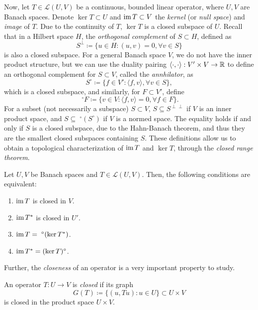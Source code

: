 Now, let $T\in \mathcal{L}(U,V)$ be a continuous, bounded linear operator, where $U,V$ are Banach spaces. Denote $\ker T\subset U$ and $\operatorname{\text{im}} T\subset V$ the \emph{kernel} (or \emph{null space}) and \emph{image} of $T$. Due to the continuity of $T$, $\ker T$ is a closed subspace of $U$. Recall that in a Hilbert space $H$, the \emph{orthogonal complement} of $S\subset H$, defined as
\begin{equation*}
    S^\perp \coloneqq \{u\in H: (u,v)=0,\forall v\in S\}
\end{equation*}
is also a closed subspace. For a general Banach space $V$, we do not have the inner product structure, but we can use the duality pairing $\langle\cdot,\cdot\rangle:V'\times V\to \mathbb{R}$ to define an orthogonal complement for $S\subset V$, called the \emph{annhilator}, as 
\begin{equation*}
    S^\circ \coloneqq \{f\in V': \langle f, v\rangle,\forall v\in S\},
\end{equation*}
which is a closed subspace, and similarly, for $F\subset V'$, define
\begin{equation*}
    \phantom{.}^\circ F \coloneqq \{v\in V:\langle f,v\rangle = 0,\forall f\in F\}.
\end{equation*}
For a subset (not necessarily a subspace) $S\subset V$, $S\subseteq S^{\perp\perp}$ if $V$ is an inner product space, and $S\subseteq\phantom{.}^\circ(S^\circ)$ if $V$ is a normed space. The equality holds if and only if $S$ is a closed subspace, due to the Hahn-Banach theorem, and thus they are the smallest closed subspaces containing $S$. These definitions allow us to obtain a topological characterization of $\operatorname{\text{im}} T$ and $\ker T$, through the \emph{closed range theorem}. 
\begin{theorem}\label{thm:closed-range-theorem}
    Let $U,V$ be Banach spaces and $T\in\mathcal{L}(U,V)$. Then, the following conditions are equivalent: 
    \begin{enumerate}
        \item $\operatorname{\text{im}} T$ is closed in $V$. 
        \item $\operatorname{\text{im}} T^*$ is closed in $U'$.
        \item $\operatorname{\text{im}} T = \phantom{.}^\circ (\ker T^*)$.
        \item $\operatorname{\text{im}} T^* = (\ker T)^\circ$.
    \end{enumerate}
\end{theorem}

Further, the \emph{closeness} of an operator is a very important property to study.
\begin{definition}
    An operator $T:U\to V$ is \emph{closed} if its graph 
    \begin{equation}
        G(T) \coloneqq \{(u,Tu):u\in U\}\subset U\times V
    \end{equation}
    is closed in the product space $U\times V$.
\end{definition}

